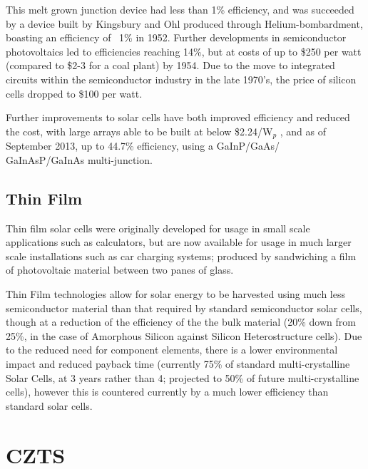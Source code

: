 This melt grown junction device had less than 1\% efficiency, and was succeeded by a device built by Kingsbury and Ohl produced through Helium-bombardment, boasting an efficiency of ~1\% in 1952. \citep{Green2009a} Further developments in semiconductor photovoltaics led to efficiencies reaching 14\%, but at costs of up to \$250 per watt (compared to \$2-3 for a coal plant) by 1954. Due to the move to integrated circuits within the semiconductor industry in the late 1970's, the price of silicon cells dropped to \$100 per watt.

Further improvements to  solar cells have both improved efficiency and reduced the cost, with large arrays able to be built at below \$2.24/W$_p$ \citep{EricWesoff}, and as of September 2013, up to 44.7\% efficiency, using a GaInP/GaAs/\\GaInAsP/GaInAs multi-junction. \citep{ISI:000331334400001}


\subsection{Thin Film}

Thin film solar cells were originally developed for usage in small scale applications such as calculators, but are now available for usage in much larger scale installations such as car charging systems; produced by sandwiching a film of photovoltaic material between two panes of glass. 

Thin Film technologies allow for solar energy to be harvested using much less semiconductor material than that required by standard semiconductor solar cells, though at a reduction of the efficiency of the the bulk material (20\% down from 25\%, in the case of Amorphous Silicon against Silicon Heterostructure cells)\citep{Photovoltaics2014}. Due to the reduced need for component elements, there is a lower environmental impact and reduced payback time (currently 75\% of standard multi-crystalline Solar Cells, at 3 years rather than 4; projected to 50\% of future multi-crystalline cells)\citep{Photovoltaics}, however this is countered currently by a much lower efficiency than standard solar cells.

\section{CZTS}

